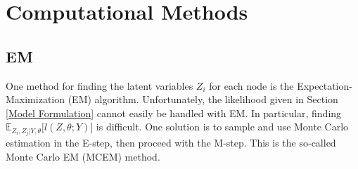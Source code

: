 \documentclass{article}
\begin{document}


\section{Computational Methods} \label{Computational Methods}

\subsection{EM}
One method for finding the latent variables $Z_i$ for each node is the Expectation-Maximization (EM) algorithm. Unfortunately, the likelihood given in Section \ref{Model Formulation} cannot easily be handled with EM. In particular, finding $\mathbb{E}_{Z_i, Z_j | Y, \theta}\Big[l(Z, \theta ; Y)\Big]$ is difficult. One solution is to sample and use Monte Carlo estimation in the E-step, then proceed with the M-step. This is the so-called Monte Carlo EM (MCEM) method. 
\end{document}
